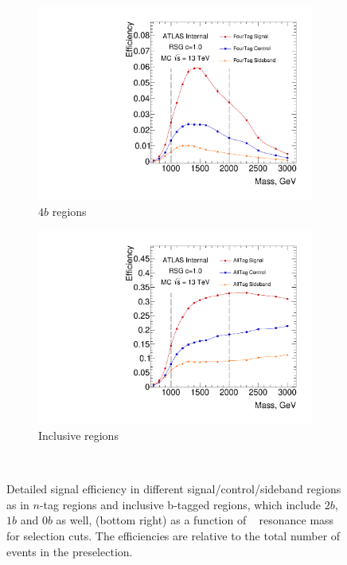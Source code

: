 \begin{figure}[htbp!]
    \begin{subfigure}[b]{0.4\textwidth}
        \includegraphics[width=\textwidth,angle=-90]{figures/boosted/SigEff/region_4b_lst_Moriond_Efficiency_PreSel.pdf}
        \caption{$4b$ regions}
        \label{fig:4b-selection-region-efficiency}
    \end{subfigure}
    \quad \quad 
    \begin{subfigure}[b]{0.4\textwidth}
        \includegraphics[width=\textwidth,angle=-90]{figures/boosted/SigEff/region_alltag_lst_Moriond_Efficiency_PreSel.pdf}
        \caption{Inclusive regions}
        \label{fig:alltag-selection-region-efficiency}
    \end{subfigure} \\ 
   \caption{
   Detailed signal efficiency in different signal/control/sideband regions as in $n$-tag regions and inclusive b-tagged regions, which include $2b$, $1b$ and 0$b$ as well, (bottom right) as a function of \Grav~ resonance mass for selection cuts. The efficiencies are relative to the total number of events in the preselection.}
  \label{fig:boosted-selection-region-efficiency}
\end{figure}


